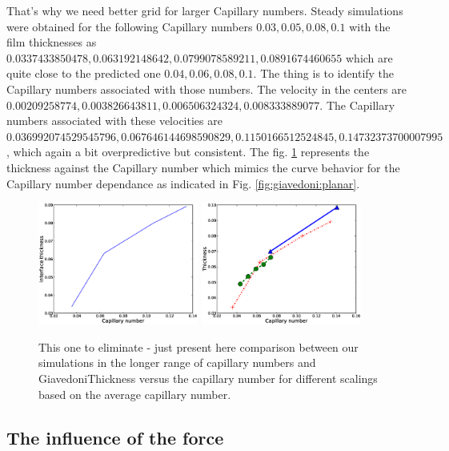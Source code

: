 \documentclass{article}
\begin{document}
{\color{red} That's why we need better grid for larger Capillary numbers. Steady
simulations were obtained for the following Capillary numbers
$0.03,0.05,0.08,0.1$  }with the film thicknesses as
{\color{red} $0.0337433850478, 0.063192148642, 0.0799078589211,
0.0891674460655$} which are
quite close to the predicted one $0.04,0.06,0.08,0.1$. The thing is to identify
the Capillary numbers associated with those numbers. The velocity in the
centers are $0.00209258774,0.003826643811,0.006506324324,0.008333889077$. The
Capillary numbers associated with these velocities are $0.036992074529545796, 
0.067646144698590829,0.1150166512524845,0.14732373700007995$, which again a bit
overpredictive but consistent. The fig.
\ref{fig:capillary:simple} represents the thickness against the Capillary
number which mimics the curve behavior for the Capillary number dependance as
indicated in Fig. \ref{fig:giavedoni:planar}.
\begin{figure}
\includegraphics[width=0.47\textwidth]{Figures/capillary_thickness_simple.eps}
\hfill
\includegraphics[width=0.47\textwidth]{Figures/capillary_range.eps}
\caption{{\color{red} This one to eliminate - just present here
comparison between our simulations in the longer range of capillary
numbers and Giavedoni}Thickness versus the capillary
number for different scalings based on
the average capillary number. \label{fig:capillary:simple}}
\end{figure}

\subsection{The influence of the force}
\end{document}
